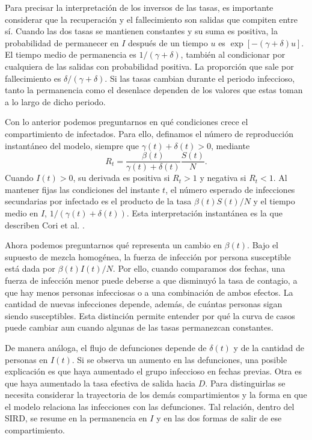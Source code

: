 Para precisar la interpretación de los inversos de las tasas, es importante considerar que la recuperación y el fallecimiento son salidas que compiten entre sí. Cuando las dos tasas se mantienen constantes y su suma es positiva, la probabilidad de permanecer en $I$ después de un tiempo $u$ es $\exp[-(\gamma+\delta)u]$. El tiempo medio de permanencia es $1/(\gamma+\delta)$, también al condicionar por cualquiera de las salidas con probabilidad positiva. La proporción que sale por fallecimiento es $\delta/(\gamma+\delta)$. Si las tasas cambian durante el periodo infeccioso, tanto la permanencia como el desenlace dependen de los valores que estas toman a lo largo de dicho periodo.


Con lo anterior podemos preguntarnos en qué condiciones crece el compartimiento de infectados. Para ello, definamos el número de reproducción instantáneo del modelo, siempre que $\gamma(t)+\delta(t)>0$, mediante
\begin{equation}
    \label{eq:reproduccion}
    R_t=\frac{\beta(t)}{\gamma(t)+\delta(t)}\frac{S(t)}{N}.
\end{equation}
Cuando $I(t)>0$, su derivada es positiva si $R_t>1$ y negativa si $R_t<1$. Al mantener fijas las condiciones del instante $t$, el número esperado de infecciones secundarias por infectado es el producto de la tasa $\beta(t)S(t)/N$ y el tiempo medio en $I$, $1/(\gamma(t)+\delta(t))$. Esta interpretación instantánea es la que describen Cori et al. \cite{cori2013}\label{cita:cori2013}.

Ahora podemos preguntarnos qué representa un cambio en $\beta(t)$. Bajo el supuesto de mezcla homogénea, la fuerza de infección por persona susceptible está dada por $\beta(t)I(t)/N$. Por ello, cuando comparamos dos fechas, una fuerza de infección menor puede deberse a que disminuyó la tasa de contagio, a que hay menos personas infecciosas o a una combinación de ambos efectos. La cantidad de nuevas infecciones depende, además, de cuántas personas sigan siendo susceptibles. Esta distinción permite entender por qué la curva de casos puede cambiar aun cuando algunas de las tasas permanezcan constantes.

De manera análoga, el flujo de defunciones depende de $\delta(t)$ y de la cantidad de personas en $I(t)$. Si se observa un aumento en las defunciones, una posible explicación es que haya aumentado el grupo infeccioso en fechas previas. Otra es que haya aumentado la tasa efectiva de salida hacia $D$. Para distinguirlas se necesita considerar la trayectoria de los demás compartimientos y la forma en que el modelo relaciona las infecciones con las defunciones. Tal relación, dentro del SIRD, se resume en la permanencia en $I$ y en las dos formas de salir de ese compartimiento.

